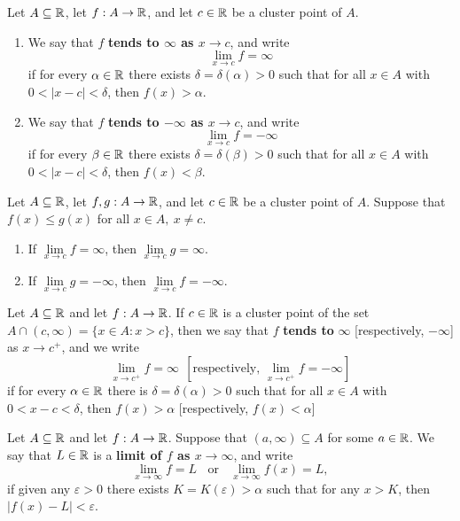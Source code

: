 \begin{theorem}
	Let $A \subseteq \mathbb{R}$, let $f:A \rightarrow \mathbb{R}$, and let $c \in \mathbb{R}$ be a cluster point of $A$.
	\begin{enumerate}
		\item We say that $f$ \textbf{tends to $\infty$ as $x \rightarrow c$}, and write
		      \[\lim\limits_{x\to c} f = \infty\]
		      if for every $\alpha \in \mathbb{R}$ there exists $\delta = \delta(\alpha) > 0$ such that for all $x \in A$ with $0 < |x-c|<\delta$, then $f(x) > \alpha$.

		\item We say that $f$ \textbf{tends to $-\infty$ as $x \rightarrow c$}, and write
		      \[\lim\limits_{x\to c} f = - \infty\]
		      if for every $\beta \in \mathbb{R}$ there exists $\delta = \delta (\beta)>0$ such that for all $x \in A$ with $0 < |x-c|<\delta$, then $f(x)<\beta$.
	\end{enumerate}
\end{theorem}

\begin{theorem}
	Let $A \subseteq \mathbb{R}$, let $f,g:A \rightarrow \mathbb{R}$, and let $c \in \mathbb{R}$ be a cluster point of $A$. Suppose that $f(x) \leq g(x)$ for all $x \in A,\ x \neq c$.
	\begin{enumerate}
		\item If $\lim\limits_{x\to c} f = \infty$, then $\lim\limits_{x\to c} g = \infty$.
		\item If $\lim\limits_{x\to c} g = -\infty$, then $\lim\limits_{x\to c} f = -\infty$.
	\end{enumerate}
\end{theorem}

\begin{definition}
	Let $A \subseteq \mathbb{R}$ and let $f:A \rightarrow \mathbb{R}$. If $c \in \mathbb{R}$ is a cluster point of the set $A \cap (c, \infty)= \{x \in A: x>c\}$, then we say that $f$ \textbf{tends to} $\infty$ [respectively, $-\infty$] as $x \rightarrow c^+$, and we write
	\[\lim\limits_{x\to c^+} f = \infty\ \ \left[\text{respectively, } \lim\limits_{x\to c^+} f = -\infty\right]\]
	if for every $\alpha \in \mathbb{R}$ there is $\delta = \delta(\alpha)>0$ such that for all $x \in A$ with $0 < x-c < \delta$, then $f(x)>\alpha$ [respectively, $f(x) < \alpha$]
\end{definition}

\begin{definition}
	Let $A \subseteq \mathbb{R}$ and let $f:A \rightarrow \mathbb{R}$. Suppose that $(a,\infty) \subseteq A$ for some $a \in \mathbb{R}$. We say that $L \in \mathbb{R}$ is a \textbf{limit of $f$ as $x \rightarrow \infty$}, and write
	\[\lim\limits_{x\to \infty} f = L\ \ \ \ \text{or}\ \ \ \ \lim\limits_{x\to \infty} f(x) = L,\]
	if given any $\varepsilon > 0$ there exists $K=K(\varepsilon)>\alpha$ such that for any $x > K$, then $|f(x) - L| < \varepsilon$.
\end{definition}

